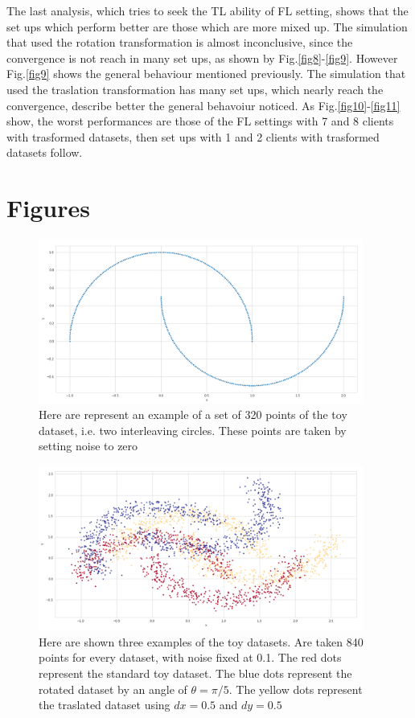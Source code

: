 \documentclass{article} %
\newcounter{points}
\newcounter{late}
\begin{document}
The last analysis, which tries to seek the TL ability of FL setting, shows that the 
set ups which perform better are those which are more mixed up.
The simulation that used the rotation transformation is almost inconclusive, since the 
convergence is not reach in many set ups, as shown by Fig.\ref{fig8}-\ref{fig9}.
However Fig.\ref{fig9} shows the general behaviour mentioned previously.
The simulation that used the traslation transformation has many set ups, which nearly reach 
the convergence, describe better the general behavoiur noticed.
As Fig.\ref{fig10}-\ref{fig11} show, the worst performances are those of the FL settings with 
7 and 8 clients with trasformed datasets, then set ups with 1 and 2 clients with trasformed 
datasets follow.


\section {Figures}
\begin{figure}[!ht]
    \centering
    \includegraphics[width=0.95\textwidth, keepaspectratio]{images/make_moons_example.png}
    \caption{Here are represent an example of a set of 320 points of the toy dataset, i.e.
        two interleaving circles. These points are taken by setting noise to zero}
    \label{fig1}
\end{figure}
\begin{figure}[!ht]
    \centering
    \includegraphics[width=0.95\textwidth, keepaspectratio]{images/datasets_examples.png}
    \caption{Here are shown three examples of the toy datasets. Are taken 840 points for 
        every dataset, with noise fixed at 0.1. The red dots represent the standard toy 
        dataset. The blue dots represent the rotated dataset by an angle of $\theta=\pi/5$.
        The yellow dots represent the traslated dataset using $dx=0.5$ and $dy=0.5$}
    \label{fig2}
\end{figure}
\end{document}
